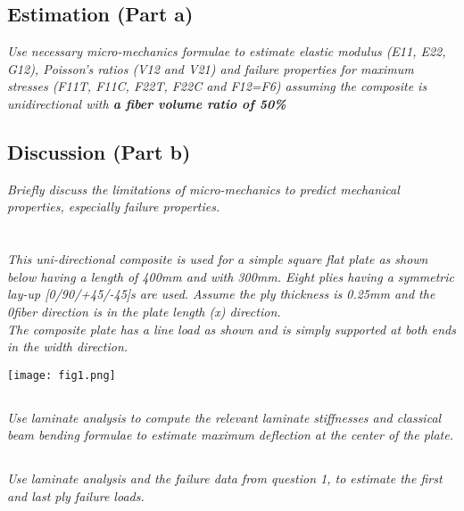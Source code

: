 \documentclass[a4paper,twosided,12pt,DIV12]{scrartcl}
\begin{document}
\subsection{Estimation (Part a)}

\textit{Use necessary micro-mechanics formulae to estimate elastic modulus (E11, E22,
G12), Poisson's ratios (V12 and V21) and failure properties for maximum stresses
(F11T, F11C, F22T, F22C and F12=F6) assuming the composite is unidirectional
with \textbf{a fiber volume ratio of 50\%}}

\subsection{Discussion (Part b)}

\textit{Briefly discuss the limitations of micro-mechanics to predict mechanical
properties, especially failure properties.}


\section{}
\textit{This uni-directional composite is used for a simple square flat plate as shown
below having a length of 400mm and with 300mm. Eight plies having a symmetric
lay-up [0/90/+45/-45]s are used. Assume the ply thickness is 0.25mm and the
0\degree fiber direction is in the plate length (x) direction.
\\The composite plate has a line load as shown and is simply supported at both
ends in the width direction.}

\begin{center}
  \texttt{[image: fig1.png]}
\end{center}

\subsection{}

\textit{Use laminate analysis to compute the relevant laminate stiffnesses and classical
beam bending formulae to estimate maximum deflection at the center of the
plate.}

\subsection{}

\textit{Use laminate analysis and the failure data from question 1, to estimate the
first and last ply failure loads.}
\end{document}
